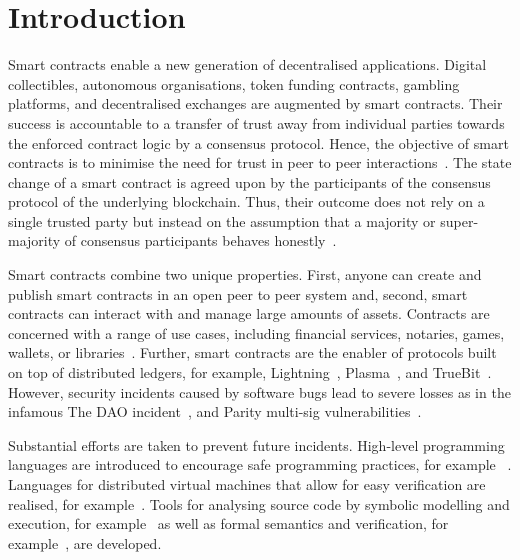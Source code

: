 \section{Introduction}
Smart contracts enable a new generation of decentralised applications.
Digital collectibles, autonomous organisations, token funding contracts, gambling platforms, and decentralised exchanges are augmented by smart contracts.
Their success is accountable to a transfer of trust away from individual parties towards the enforced contract logic by a consensus protocol.
Hence, the objective of smart contracts is to minimise the need for trust in peer to peer interactions~\cite{Szabo1997}.
The state change of a smart contract is agreed upon by the participants of the consensus protocol of the underlying blockchain.
Thus, their outcome does not rely on a single trusted party but instead on the assumption that a majority or super-majority of consensus participants behaves honestly~\cite{Nakamoto2008,Eyal2014}.

Smart contracts combine two unique properties. 
First, anyone can create and publish smart contracts in an open peer to peer system and, second, smart contracts can interact with and manage large amounts of assets.
Contracts are concerned with a range of use cases, including financial services, notaries, games, wallets, or libraries~\cite{Bartoletti2017}.
Further, smart contracts are the enabler of protocols built on top of distributed ledgers, for example, Lightning~\cite{Poon2016}, Plasma~\cite{Poon2017}, and TrueBit~\cite{Teutsch2017}.
However, security incidents caused by software bugs lead to severe losses as in the infamous The DAO incident~\cite{Daian2016}, and Parity multi-sig vulnerabilities~\cite{Breidenbach2017Parity,ParityTech2017}. 

Substantial efforts are taken to prevent future incidents. 
High-level programming languages are introduced to encourage safe programming practices, for example ~\cite{Hirai2018Bamboo,Ethereum2018Vyper,Schrans2018}.
Languages for distributed virtual machines that allow for easy verification are realised, for example~\cite{Sergey2018,DynamicLedgerSolutions2017,Popejoy2017,Kasampalis2018}.
Tools for analysing source code by symbolic modelling and execution, for example~\cite{Luu2016,Tsankov2017,Kalra2018,Albert2018} as well as formal semantics and verification, for example~\cite{Bhargavan2016,Hildenbrandt2017,Hirai2017}, are developed.

